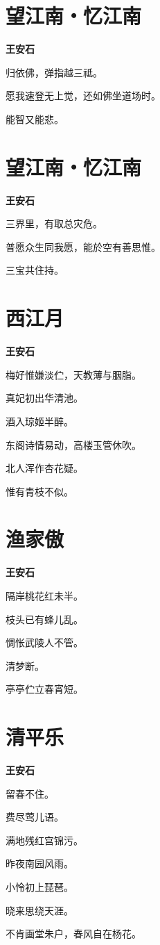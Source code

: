 \documentclass[12pt,a4paper]{ctexbook}
\begin{document}
\section{望江南・忆江南}
\textbf{王安石}\par\vspace{0.5em}
归依佛，弹指越三祗。\par
愿我速登无上觉，还如佛坐道场时。\par
能智又能悲。\par

\section{望江南・忆江南}
\textbf{王安石}\par\vspace{0.5em}
三界里，有取总灾危。\par
普愿众生同我愿，能於空有善思惟。\par
三宝共住持。\par

\section{西江月}
\textbf{王安石}\par\vspace{0.5em}
梅好惟嫌淡伫，天教薄与胭脂。\par
真妃初出华清池。\par
酒入琼姬半醉。\par
东阁诗情易动，高楼玉管休吹。\par
北人浑作杏花疑。\par
惟有青枝不似。\par

\section{渔家傲}
\textbf{王安石}\par\vspace{0.5em}
隔岸桃花红未半。\par
枝头已有蜂儿乱。\par
惆怅武陵人不管。\par
清梦断。\par
亭亭伫立春宵短。\par

\section{清平乐}
\textbf{王安石}\par\vspace{0.5em}
留春不住。\par
费尽莺儿语。\par
满地残红宫锦污。\par
昨夜南园风雨。\par
小怜初上琵琶。\par
晓来思绕天涯。\par
不肯画堂朱户，春风自在杨花。\par
\end{document}
